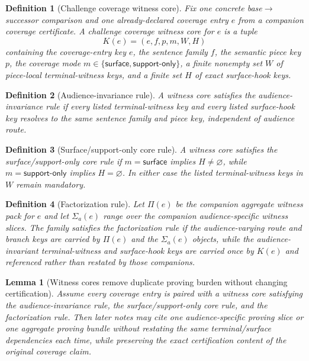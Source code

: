 \documentclass[11pt]{article}
\newtheorem{definition}{Definition}
\newtheorem{lemma}{Lemma}
\begin{document}
\begin{definition}[Challenge coverage witness core]
Fix one concrete base$\to$successor comparison and one already-declared coverage entry $e$ from a companion coverage certificate.
A \emph{challenge coverage witness core} for $e$ is a tuple
\[
K(e)=(e,f,p,m,W,H)
\]
containing the coverage-entry key $e$, the sentence family $f$, the semantic piece key $p$, the coverage mode $m\in\{\textsf{surface},\textsf{support-only}\}$, a finite nonempty set $W$ of piece-local terminal-witness keys, and a finite set $H$ of exact surface-hook keys.
\end{definition}

\begin{definition}[Audience-invariance rule]
A witness core satisfies the \emph{audience-invariance rule} if every listed terminal-witness key and every listed surface-hook key resolves to the same sentence family and piece key, independent of audience route.
\end{definition}

\begin{definition}[Surface/support-only core rule]
A witness core satisfies the \emph{surface/support-only core rule} if $m=\textsf{surface}$ implies $H\neq\varnothing$, while $m=\textsf{support-only}$ implies $H=\varnothing$.
In either case the listed terminal-witness keys in $W$ remain mandatory.
\end{definition}

\begin{definition}[Factorization rule]
Let $\Pi(e)$ be the companion aggregate witness pack for $e$ and let $\Sigma_a(e)$ range over the companion audience-specific witness slices.
The family satisfies the \emph{factorization rule} if the audience-varying route and branch keys are carried by $\Pi(e)$ and the $\Sigma_a(e)$ objects, while the audience-invariant terminal-witness and surface-hook keys are carried once by $K(e)$ and referenced rather than restated by those companions.
\end{definition}

\begin{lemma}[Witness cores remove duplicate proving burden without changing certification]
Assume every coverage entry is paired with a witness core satisfying the audience-invariance rule, the surface/support-only core rule, and the factorization rule.
Then later notes may cite one audience-specific proving slice or one aggregate proving bundle without restating the same terminal/surface dependencies each time, while preserving the exact certification content of the original coverage claim.
\end{lemma}
\end{document}
